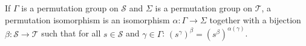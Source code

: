 If $\Gamma$ is a permutation group on $\mathcal{S}$ and $\Sigma$ is a permutation group on $\mathcal{T}$, a permutation isomorphism is an isomorphism $\alpha : \Gamma \to \Sigma$ together with a bijection $\beta : \mathcal{S} \to \mathcal{T}$ such that for all $s \in \mathcal{S}$ and $\gamma \in \Gamma$: $(s^\gamma)^\beta = (s^\beta)^{\alpha(\gamma)}$.
